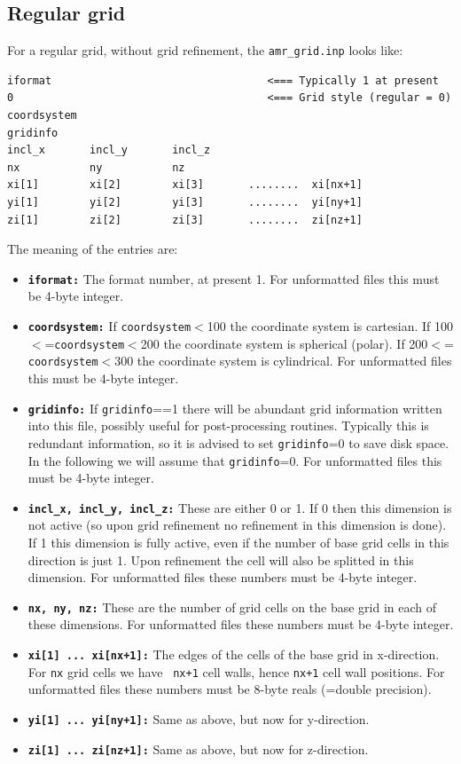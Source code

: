\documentclass{report}
\newenvironment{asciibox}%
  {\begin{list}{}{%
    \setlength{\topsep}{0.5em}%
    \setlength{\parskip}{0em}%
    \setlength{\parsep}{0em}%
    \setlength{\itemsep}{0em}%
    \setlength{\rightmargin}{0em}%
    \setlength{\leftmargin}{3.0em}%
    \setlength{\labelsep}{1em}%
    \setlength{\labelwidth}{2em}%
  }\normalfont\footnotesize\item}
  {\end{list}}
\begin{document}
\subsection{Regular grid}
\label{sec-amr-grid-regular}
%
For a regular grid, without grid refinement, the {\small\tt amr\_grid.inp}
looks like:
\begin{asciibox}\begin{verbatim}
iformat                                  <=== Typically 1 at present
0                                        <=== Grid style (regular = 0)
coordsystem
gridinfo
incl_x       incl_y       incl_z
nx           ny           nz
xi[1]        xi[2]        xi[3]       ........  xi[nx+1]
yi[1]        yi[2]        yi[3]       ........  yi[ny+1]
zi[1]        zi[2]        zi[3]       ........  zi[nz+1]
\end{verbatim}\end{asciibox}
The meaning of the entries are:
\begin{itemize}
\item[] {\small\tt\bf iformat:} The format number, at present 1. For
  unformatted files this must be 4-byte integer.
\item[] {\small\tt\bf coordsystem:} If {\small\tt coordsystem}$<$100 the
  coordinate system is cartesian. If 100$<$={\small\tt coordsystem}$<$200
  the coordinate system is spherical (polar). If 200$<$={\small\tt
    coordsystem}$<$300 the coordinate system is cylindrical. For unformatted
  files this must be 4-byte integer.
\item[] {\small\tt\bf gridinfo:} If {\small\tt gridinfo}==1 there will be
  abundant grid information written into this file, possibly useful for
  post-processing routines. Typically this is redundant information, so it
  is advised to set {\small\tt gridinfo}=0 to save disk space. In the
  following we will assume that {\small\tt gridinfo}=0. For unformatted
  files this must be 4-byte integer.
\item[] {\small\tt\bf incl\_x, incl\_y, incl\_z:} These are either 0 or
  1. If 0 then this dimension is not active (so upon grid refinement no
  refinement in this dimension is done). If 1 this dimension is fully
  active, even if the number of base grid cells in this direction is just
  1. Upon refinement the cell will also be splitted in this dimension. For
  unformatted files these numbers must be 4-byte integer.
\item[] {\small\tt\bf nx, ny, nz:} These are the number of grid cells on the
  base grid in each of these dimensions. For unformatted files these numbers
  must be 4-byte integer.
\item[] {\small\tt\bf xi[1] ... xi[nx+1]:} The edges of the cells of the
  base grid in x-direction. For {\small\tt nx} grid cells we have {\small\tt
    nx+1} cell walls, hence {\small\tt nx+1} cell wall positions. For
  unformatted files these numbers must be 8-byte reals (=double precision).
\item[] {\small\tt\bf yi[1] ... yi[ny+1]:} Same as above, but now for
  y-direction.
\item[] {\small\tt\bf zi[1] ... zi[nz+1]:} Same as above, but now for
  z-direction.
\end{itemize}
\end{document}
